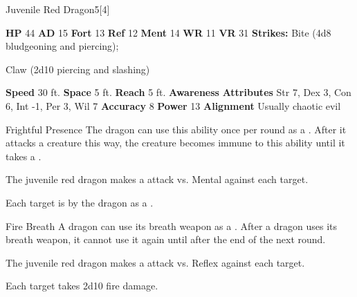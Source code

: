   \begin{monsubsection}{Juvenile Red Dragon}{5}[4]
    \vspace{-1em}\vspace{-1em}
    \vspace{0em}

    
    

    \begin{spellcontent}
      \begin{spelltargetinginfo}
        \pari \textbf{HP} 44 \monsep
          \textbf{AD} 15 \monsep
          \textbf{Fort} 13 \monsep
          \textbf{Ref} 12 \monsep
          \textbf{Ment} 14
        \pari \textbf{WR} 11 \monsep
        \textbf{VR} 31
        \pari \textbf{Strikes:}
            Bite  (4d8 bludgeoning and piercing);
\par Claw  (2d10 piercing and slashing)
      \end{spelltargetinginfo}
    \end{spellcontent}
    \begin{monsterfooter}
      \pari \textbf{Speed} 30 ft. \monsep
        \textbf{Space} 5 ft. \monsep
        \textbf{Reach} 5 ft.
      \pari \textbf{Awareness} 
      \pari \textbf{Attributes}
        Str 7, Dex 3,
        Con 6, Int -1,
        Per 3, Wil 7
      \pari \textbf{Accuracy} 8 \monsep
        \textbf{Power} 13
      \pari \textbf{Alignment} Usually chaotic evil
    \end{monsterfooter}
  \end{monsubsection}
  \begin{freeability}{Frightful Presence}
      The dragon can use this ability once per round as a .
      After it attacks a creature this way, the creature becomes immune to this ability until it takes a .
      \par The juvenile red dragon makes a  attack
        vs. Mental against each target.
    
    \hit Each target is  by the dragon as a .
    \end{freeability}
  

    \begin{freeability}{Fire Breath}
      A dragon can use its breath weapon as a .
      After a dragon uses its breath weapon, it cannot use it again until after the end of the next round.
      \par The juvenile red dragon makes a  attack
        vs. Reflex against each target.
    
    \hit Each target takes 2d10 fire damage.
    \end{freeability}
  
